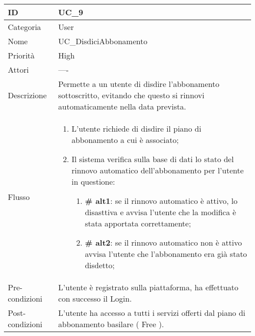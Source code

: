 \begin{center}
\begin{tabular}{ |p{2cm}|p{13cm}|  }
\hline
ID & UC\_9 \\\hline
Categoria & User\\\hline
Nome & UC\_DisdiciAbbonamento\\\hline
Priorità & High \\\hline
Attori &  ---- \\\hline
Descrizione & Permette a un utente di disdire l'abbonamento sottoscritto, evitando che questo si rinnovi automaticamente nella data prevista.\\\hline
Flusso &  	\begin{enumerate}
			\item L'utente richiede di disdire il piano di abbonamento a cui è associato;
			\item Il sistema verifica sulla base di dati lo stato del rinnovo automatico dell'abbonamento per l'utente in questione:
			\begin{enumerate}[  ]
				\item \textbf{\# alt1}: se il rinnovo automatico è attivo, lo disasttiva e avvisa l'utente che la modifica è stata apportata correttamente;
				\item \textbf{\# alt2}: se il rinnovo automatico non è attivo avvisa l'utente che l'abbonamento era già stato disdetto;
			\end{enumerate}
		\end{enumerate}\\\hline
Pre-condizioni & L'utente è registrato sulla piattaforma, ha effettuato con successo il Login.\\\hline
Post-condizioni &  L'utente ha accesso a tutti i servizi offerti dal piano di abbonamento basilare ( Free ).\\\hline
\end{tabular}
\label{table_use_case:9}\newline


\end{center}
